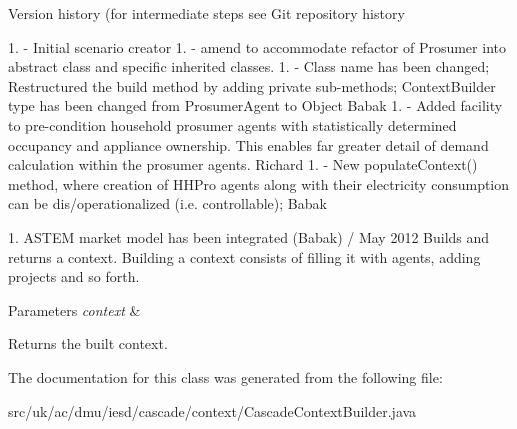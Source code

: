 Version history (for intermediate steps see Git repository history

1. -\/ Initial scenario creator 1. -\/ amend to accommodate refactor of Prosumer into abstract class and specific inherited classes. 1. -\/ Class name has been changed; Restructured the build method by adding private sub-\/methods; Context\-Builder type has been changed from Prosumer\-Agent to Object Babak 1. -\/ Added facility to pre-\/condition household prosumer agents with statistically determined occupancy and appliance ownership. This enables far greater detail of demand calculation within the prosumer agents. Richard 1. -\/ New populate\-Context() method, where creation of H\-H\-Pro agents along with their electricity consumption can be dis/operationalized (i.\-e. controllable); Babak

1. A\-S\-T\-E\-M market model has been integrated (Babak) / May 2012 Builds and returns a context. Building a context consists of filling it with agents, adding projects and so forth.


\begin{DoxyParams}{Parameters}
{\em context} & \\
\hline
\end{DoxyParams}
\begin{DoxyReturn}{Returns}
the built context. 
\end{DoxyReturn}


The documentation for this class was generated from the following file\-:\begin{DoxyCompactItemize}
\item 
src/uk/ac/dmu/iesd/cascade/context/Cascade\-Context\-Builder.\-java\end{DoxyCompactItemize}
